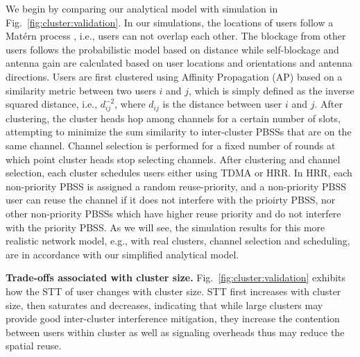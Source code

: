 \documentclass[10pt, conference, letterpaper]{IEEEtran}
\newcommand*{\Rom}[1]{\uppercase\expandafter{\romannumeral #1\relax}} %
\begin{document}
We begin by comparing our analytical model with simulation in Fig.~\ref{fig:cluster:validation}. 
In our simulations, the locations of users follow a Mat\'ern \Rom{3} process \cite{matern}, i.e., users can not overlap each other.
The blockage from other users follows the probabilistic model based on distance while self-blockage and antenna gain are calculated based on user locations and orientations and antenna directions.
Users are first clustered using Affinity Propagation (AP) \cite{apcluster} based on a similarity metric between two users $i$ and $j$, which is simply defined as the inverse squared distance, i.e., $d_{ij}^{-2}$, where $d_{ij}$ is the distance between user $i$ and $j$.
After clustering, the cluster heads hop among channels for a certain number of slots, attempting to  minimize the sum similarity to inter-cluster PBSSs that are on the same channel.
Channel selection is performed for a fixed number of rounds at which point cluster heads stop selecting channels.
After clustering and channel selection, each cluster schedules users either using TDMA or HRR. 
In HRR, each non-priority PBSS is assigned a random reuse-priority, and a non-priority PBSS user can reuse the channel if it does not interfere with the prioirty PBSS, nor other non-priority PBSSs which have higher reuse priority and do not interfere with the priority PBSS. 
As we will see, the simulation results for this more realistic network model, e.g., with real clusters, channel selection and scheduling, are in accordance with our simplified analytical model.






\textbf{Trade-offs associated with cluster size.} 
Fig.~\ref{fig:cluster:validation} exhibits how the STT of user changes with cluster size.
STT first increases with cluster size, then saturates and decreases, indicating that while large clusters may provide good inter-cluster interference mitigation, they increase the contention between users within cluster as well as signaling overheads thus may reduce the spatial reuse.
\end{document}
